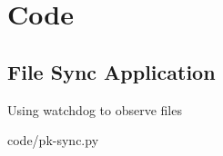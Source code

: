 \chapter{Code}\label{apx:code}

\section{File Sync Application}\label{apx:file-sync-code}

Using watchdog to observe files

\begin{lstinputlisting}
[language=Python]{code/pk-sync.py}
\end{lstinputlisting}